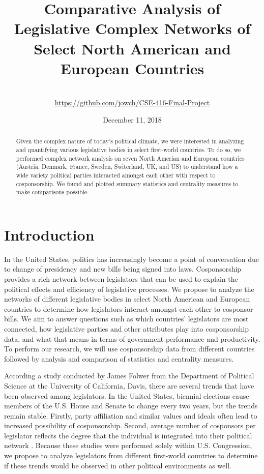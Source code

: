 \documentclass[12pt]{article}
\title{Comparative Analysis of Legislative Complex Networks of Select North American and European Countries}
\author{\names \\ \small\url{https://github.com/jowch/CSE-416-Final-Project}}
\date{December 11, 2018}
\begin{document}
\maketitle
\thispagestyle{empty}

\begin{abstract}
    Given the complex nature of today's political climate, we were interested in analyzing and quantifying various legislative bodies in select first-world countries. To do so, we performed complex network analysis on seven North Amerian and European countries (Austria, Denmark, France, Sweden, Switerland, UK, and US) to understand how a wide variety political parties interacted amongst each other with respect to cosponsorship. We found and plotted summary statistics and centrality measures to make comparisons possible.
\end{abstract}

\section{Introduction} 

In the United States, politics has increasingly become a point of conversation due to change of presidency and new bills being signed into laws. Cosponsorship provides a rich network between legislators that can be used to explain the political effects and efficiency of legislative processes. We propose to analyze the networks of different legislative bodies in select North American and European countries to determine how legislators interact amongst each other to cosponsor bills. We aim to answer questions such as which countries' legislators are most connected, how legislative parties and other attributes play into cosponsorship data, and what that means in terms of government performance and productivity. To perform our research, we will use cosponsorship data from different countries followed by analysis and comparison of statistics and centrality measures.

According a study conducted by James Folwer from the Department of Political Science at the University of California, Davis, there are several trends that have been observed among legislators. In the United States, biennial elections cause members of the U.S. House and Senate to change every two years, but the trends remain stable. Firstly, party affiliation and similar values and ideals often lead to increased possibility of cosponsorship. Second, average number of cosponsors per legislator reflects the degree that the individual is integrated into their political network \cite{fowler1}. Because these studies were performed solely within U.S. Congression, we propose to analyze legislators from different first-world countries to determine if these trends would be observed in other political environments as well.
 
\end{document}
